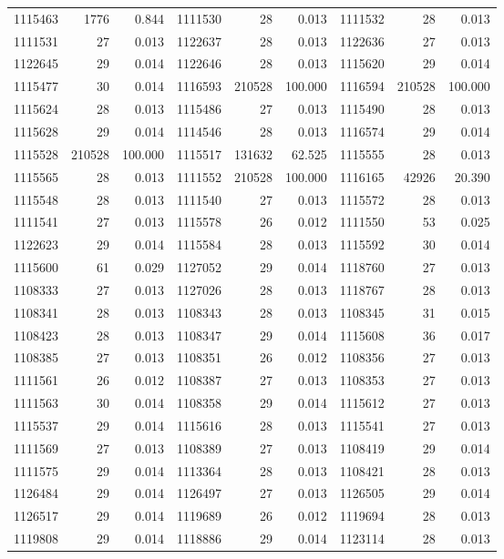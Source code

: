 \documentclass[11pt,a4paper]{article}
\begin{document}
\begin{longtable}{rrr|rrr|rrr}
1115463 & 1776 & 0.844 & 1111530 & 28 & 0.013 & 1111532 & 28 & 0.013\\
1111531 & 27 & 0.013 & 1122637 & 28 & 0.013 & 1122636 & 27 & 0.013\\
1122645 & 29 & 0.014 & 1122646 & 28 & 0.013 & 1115620 & 29 & 0.014\\
1115477 & 30 & 0.014 & 1116593 & 210528 & 100.000 & 1116594 & 210528 & 100.000\\
1115624 & 28 & 0.013 & 1115486 & 27 & 0.013 & 1115490 & 28 & 0.013\\
1115628 & 29 & 0.014 & 1114546 & 28 & 0.013 & 1116574 & 29 & 0.014\\
1115528 & 210528 & 100.000 & 1115517 & 131632 & 62.525 & 1115555 & 28 & 0.013\\
1115565 & 28 & 0.013 & 1111552 & 210528 & 100.000 & 1116165 & 42926 & 20.390\\
1115548 & 28 & 0.013 & 1111540 & 27 & 0.013 & 1115572 & 28 & 0.013\\
1111541 & 27 & 0.013 & 1115578 & 26 & 0.012 & 1111550 & 53 & 0.025\\
1122623 & 29 & 0.014 & 1115584 & 28 & 0.013 & 1115592 & 30 & 0.014\\
1115600 & 61 & 0.029 & 1127052 & 29 & 0.014 & 1118760 & 27 & 0.013\\
1108333 & 27 & 0.013 & 1127026 & 28 & 0.013 & 1118767 & 28 & 0.013\\
1108341 & 28 & 0.013 & 1108343 & 28 & 0.013 & 1108345 & 31 & 0.015\\
1108423 & 28 & 0.013 & 1108347 & 29 & 0.014 & 1115608 & 36 & 0.017\\
1108385 & 27 & 0.013 & 1108351 & 26 & 0.012 & 1108356 & 27 & 0.013\\
1111561 & 26 & 0.012 & 1108387 & 27 & 0.013 & 1108353 & 27 & 0.013\\
1111563 & 30 & 0.014 & 1108358 & 29 & 0.014 & 1115612 & 27 & 0.013\\
1115537 & 29 & 0.014 & 1115616 & 28 & 0.013 & 1115541 & 27 & 0.013\\
1111569 & 27 & 0.013 & 1108389 & 27 & 0.013 & 1108419 & 29 & 0.014\\
1111575 & 29 & 0.014 & 1113364 & 28 & 0.013 & 1108421 & 28 & 0.013\\
1126484 & 29 & 0.014 & 1126497 & 27 & 0.013 & 1126505 & 29 & 0.014\\
1126517 & 29 & 0.014 & 1119689 & 26 & 0.012 & 1119694 & 28 & 0.013\\
1119808 & 29 & 0.014 & 1118886 & 29 & 0.014 & 1123114 & 28 & 0.013\\

\end{longtable}
\end{document}
